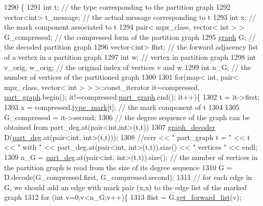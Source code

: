 \begin{DoxyCode}
1290 \{
1291   \textcolor{keywordtype}{int} t; \textcolor{comment}{// the type corresponding to the partition graph}
1292   vector<int> t\_message; \textcolor{comment}{// the actual message corresponding to t}
1293   \textcolor{keywordtype}{int} x; \textcolor{comment}{// the mark component associated to t}
1294   pair< mpz\_class, vector< int > > G\_compressed; \textcolor{comment}{// the compressed form of the partition graph}
1295   \hyperlink{classgraph}{graph} G; \textcolor{comment}{// the decoded partition graph}
1296   vector<int> flist; \textcolor{comment}{// the forward adjacency list of a vertex in a partition graph}
1297   \textcolor{keywordtype}{int} w; \textcolor{comment}{// vertex in partition graph}
1298   \textcolor{keywordtype}{int} v\_orig, w\_orig; \textcolor{comment}{// the original index of vertices v and w}
1299   \textcolor{keywordtype}{int} n\_G; \textcolor{comment}{// the number of vertices of the partitioned graph }
1300 
1301   \textcolor{keywordflow}{for}(map< \textcolor{keywordtype}{int}, pair< mpz\_class, vector< int > > >::const\_iterator it=compressed.
      \hyperlink{classmarked__graph__compressed_ae179a4737e6eab905c18a94d44ef64b7}{part\_graph}.begin(); it!=compressed.\hyperlink{classmarked__graph__compressed_ae179a4737e6eab905c18a94d44ef64b7}{part\_graph}.end(); it++)\{
1302     t = it->first;
1303     x = compressed.\hyperlink{classmarked__graph__compressed_a86b00223525703e973415cbc9c94da68}{type\_mark}[t]; \textcolor{comment}{// the mark component of t }
1304 
1305     G\_compressed = it->second;
1306     \textcolor{comment}{// the degree sequence of the graph can be obtained from part\_deg.at(pair<int,int>(t,t))}
1307     \hyperlink{classgraph__decoder}{graph\_decoder} D(\hyperlink{classmarked__graph__decoder_a6882e96fcad9abb10e72f1398814824a}{part\_deg}.at(pair<int, int>(t,t)));
1308     \textcolor{comment}{//cerr << " part\_graph t = " << t << " with " << part\_deg.at(pair<int, int>(t,t)).size() << " vertices
       " << endl;}
1309     n\_G = \hyperlink{classmarked__graph__decoder_a6882e96fcad9abb10e72f1398814824a}{part\_deg}.at(pair<int, int>(t,t)).size(); \textcolor{comment}{// the number of vertices in the partition graph
       is read from the size of its degree sequence}
1310     G = D.decode(G\_compressed.first, G\_compressed.second);
1311     \textcolor{comment}{// for each edge in G, we should add an edge with mark pair (x,x) to the edge list of the marked graph}
1312     \textcolor{keywordflow}{for} (\textcolor{keywordtype}{int} v=0;v<n\_G;v++)\{
1313       flist = G.\hyperlink{classgraph_aa8fbee52a7b3604dbbd9175040c7ead5}{get\_forward\_list}(v);

\end{DoxyCode}
